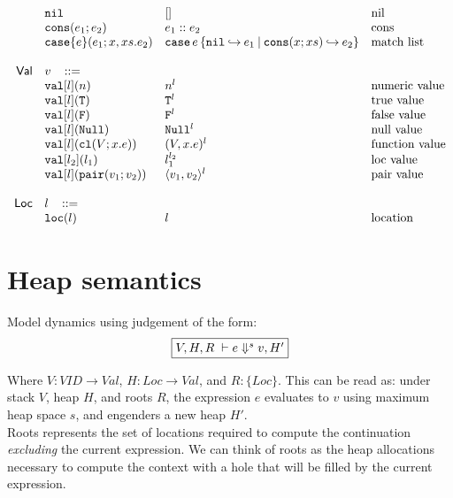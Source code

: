 \documentclass[11pt]{article}
\newcommand{\ms}[1]{\ensuremath{\mathsf{#1}}}
\newcommand{\irl}[1]{\mathtt{#1}}
\begin{document}
\[\begin{array}{r l l l l}
 	& \nilexabt					& []   										& \text{nil}\\
 	& \consexabt{e_1}{e_2}					& e_1::e_2   										& \text{cons}\\
 	& \listcaseexabt{e}{e_1}{x}{xs}{e_2}					& \listcaseexcst{e}{e_1}{x}{xs}{e_2}   	& \text{match list}\\
  \\
\ms{Val}
        & v   \,\,\,\,\, ::= \\
 	& \irl{val}[l](n)                                			& n^l 												& \text{numeric value}\\
 	& \irl{val}[l](\irl{T})                               			& \irl{T}^l 								  & \text{true value}\\
 	& \irl{val}[l](\irl{F})                                			& \irl{F}^l								  & \text{false value}\\
 	& \irl{val}[l](\irl{Null})                                  & \irl{Null}^l 								  & \text{null value}\\
 	& \irl{val}[l](\irl{cl}(V; x.e))                & (V, x.e)^l 					& \text{function value}\\
 	& \irl{val}[l_2](l_1)                                			& l_1^{l_2} 								  & \text{loc value}\\
 	& \irl{val}[l](\pairexabt{v_1}{v_2})                             & \pairexcst{v_1}{v_2}^l 								  & \text{pair value}\\
  \\
\ms{Loc}
        & l   \,\,\,\,\, ::= \\
 	& \irl{loc}(l)                                			& l 												& \text{location}\\
\end{array}
\]

\section{Heap semantics}

Model dynamics using judgement of the form:
\[
\fbox{$V,H,R \; \vdash e \Downarrow^s v, H'$}
\]

Where $V : VID \to Val$, $H : Loc \to Val$, and $R : \{Loc\}$. This can be read as: under stack $V$, heap $H$, and roots $R$,
the expression $e$ evaluates to $v$ using maximum heap space $s$, and engenders a new heap $H'$.\\

Roots represents the set of locations required to compute the continuation \emph{excluding} the current expression.
We can think of roots as the heap allocations necessary to compute the context with a hole that will be filled
by the current expression.\\
\end{document}
